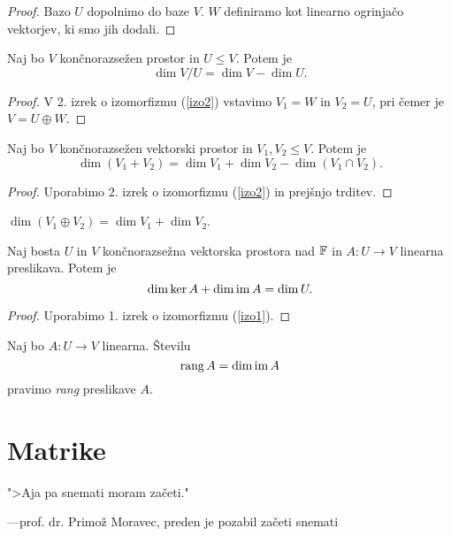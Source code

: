 \documentclass[12pt, a4paper]{article}
\begin{document}
\begin{proof}
Bazo $U$ dopolnimo do baze $V$. $W$ definiramo kot linearno ogrinjačo vektorjev, ki smo jih dodali.
\end{proof}

\begin{trditev}
Naj bo $V$ končnorazsežen prostor in $U\leq V$. Potem je
\[
\dim V/U=\dim V-\dim U.
\]
\end{trditev}

\begin{proof}
V 2. izrek o izomorfizmu (\ref{izo2}) vstavimo $V_1=W$ in $V_2=U$, pri čemer je $V=U\oplus W$.
\end{proof}

\begin{trditev}
Naj bo $V$ končnorazsežen vektorski prostor in $V_1,V_2\leq V$. Potem je
\[
\dim(V_1+V_2)=\dim V_1+\dim V_2-\dim(V_1\cap V_2).
\]
\end{trditev}

\begin{proof}
Uporabimo 2. izrek o izomorfizmu (\ref{izo2}) in prejšnjo trditev.
\end{proof}

\begin{posledica}
$\dim(V_1\oplus V_2)=\dim V_1+\dim V_2$.
\end{posledica}

\begin{trditev}
Naj bosta $U$ in $V$ končnorazsežna vektorska prostora nad $\mathbb{F}$ in $A\colon U\to V$ linearna preslikava. Potem je
\[
\dim\ker A+\dim\operatorname{im} A=\dim U.
\]
\end{trditev}

\begin{proof}
Uporabimo 1. izrek o izomorfizmu (\ref{izo1}).
\end{proof}

\begin{definicija}
Naj bo $A\colon U\to V$ linearna. Številu
\[
\operatorname{rang} A=\dim\operatorname{im} A
\]
pravimo \emph{rang} preslikave $A$.
\end{definicija}

\newpage

\section{Matrike}

\epigraph{">Aja pa snemati moram začeti."}{---prof. dr. Primož Moravec, preden je pozabil začeti snemati}
\end{document}
